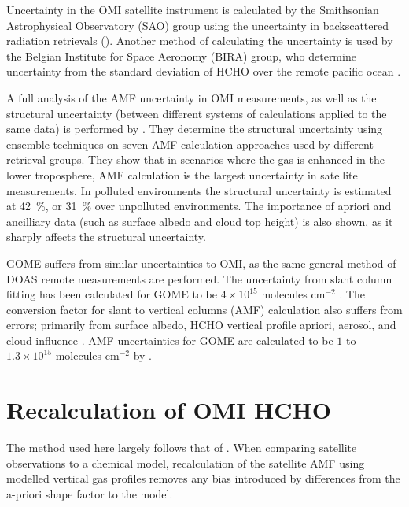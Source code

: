       Uncertainty in the OMI satellite instrument is calculated by the Smithsonian Astrophysical Observatory (SAO) group using the uncertainty in backscattered radiation retrievals (\cite{Abad2015, Abad2016}).
      Another method of calculating the uncertainty is used by the Belgian Institute for Space Aeronomy (BIRA) group, who determine uncertainty from the standard deviation of HCHO over the remote pacific ocean \citep{DeSmedt2012, DeSmedt2015}.
      
      A full analysis of the AMF uncertainty in OMI measurements, as well as the structural uncertainty (between different systems of calculations applied to the same data) is performed by \cite{Lorente2017}.
      They determine the structural uncertainty using ensemble techniques on seven AMF calculation approaches used by different retrieval groups.
      They show that in scenarios where the gas is enhanced in the lower troposphere, AMF calculation is the largest uncertainty in satellite measurements.
      In polluted environments the structural uncertainty is estimated at 42~\%, or 31~\% over unpolluted environments.
      The importance of apriori and ancilliary data (such as surface albedo and cloud top height) is also shown, as it sharply affects the structural uncertainty.
      
      GOME suffers from similar uncertainties to OMI, as the same general method of DOAS remote measurements are performed.
      The uncertainty from slant column fitting has been calculated for GOME to be $4\times10^{15}$ molecules cm$^{-2}$ \citep{Chance2000, Millet2006}. 
      The conversion factor for slant to vertical columns (AMF) calculation also suffers from errors; primarily from surface albedo, HCHO vertical profile apriori, aerosol, and cloud influence \citep{Millet2006}. 
      AMF uncertainties for GOME are calculated to be $1$ to $1.3\times10^{15}$ molecules cm$^{-2}$ by \cite{Shim2005}.

\section{Recalculation of OMI HCHO}
  \label{Model:omiRecalc}
  
  The method used here largely follows that of \citet{Palmer2001}.
  When comparing satellite observations to a chemical model, recalculation of the satellite AMF using modelled vertical gas profiles removes any bias introduced by differences from the a-priori shape factor to the model.
  
